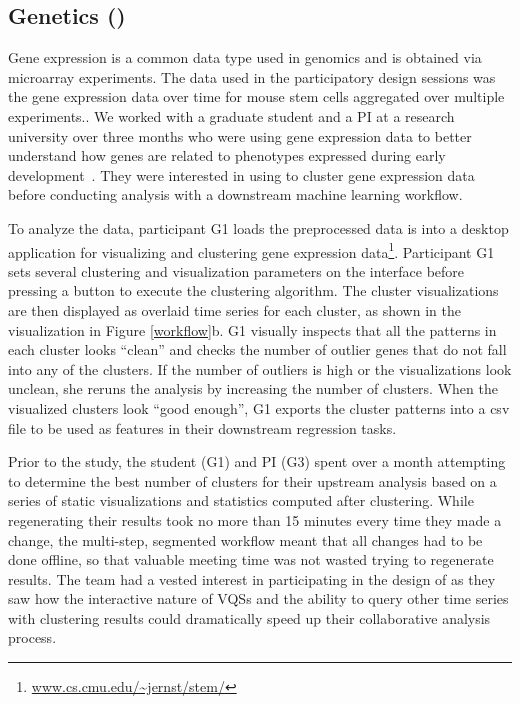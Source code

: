 \subsection{Genetics (\bio)} 
\par Gene expression is a common data type used in genomics and is obtained via microarray experiments.  The data used in the participatory design sessions was the gene expression data over time for mouse stem cells aggregated over multiple experiments.. We worked with a graduate student and a PI at a research university over three months who were using gene expression data to better understand how genes are related to phenotypes expressed during early development~\cite{Peng2016,Gloss2017}. They were interested in using \zv to cluster gene expression data before conducting analysis with a downstream machine learning workflow. 
\par To analyze the data, participant G1 loads the preprocessed data is into a desktop application for visualizing and clustering gene expression data\footnote{\url{www.cs.cmu.edu/~jernst/stem/}}. Participant G1 sets several clustering and visualization parameters on the interface before pressing a button to execute the clustering algorithm. The cluster visualizations are then displayed as overlaid time series for each cluster, as shown in the visualization in Figure \ref{workflow}b. G1 visually inspects that all the patterns in each cluster looks ``clean'' and checks the number of outlier genes that do not fall into any of the clusters.  If the number of outliers is high or the visualizations look unclean, she reruns the analysis by increasing the number of clusters. When the visualized clusters look ``good enough'', G1 exports the cluster patterns into a csv file to be used as features in their downstream regression tasks.
\par Prior to the study, the student (G1) and PI (G3) spent over a month attempting to determine the best number of clusters for their upstream analysis based on a series of static visualizations and statistics computed after clustering. While regenerating their results took no more than 15 minutes every time they made a change, the multi-step, segmented workflow meant that all changes had to be done offline, so that valuable meeting time was not wasted trying to regenerate results. The team had a vested interest in participating in the design of \zv as they saw how the interactive nature of VQSs and the ability to query other time series with clustering results could dramatically speed up their collaborative analysis process. 

